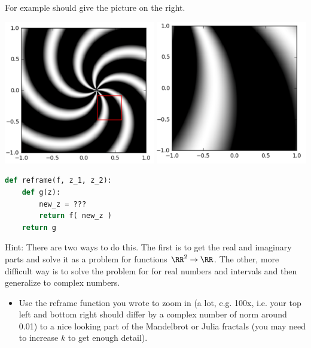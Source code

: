 \documentclass[letterpaper,11pt]{amsart}
\theoremstyle{plain}
\theoremstyle{definition}
\begin{document}
For example  should give the picture on the right. 
\begin{center}
\noindent\includegraphics[width=2.6in]{im5_prezoom.png}
\noindent\includegraphics[width=2.6in]{im5_zoomed.png}
\end{center}

\begin{lstlisting}[language=python]
def reframe(f, z_1, z_2):
    def g(z):
        new_z = ???
        return f( new_z )
    return g
\end{lstlisting}

Hint: There are two ways to do this. The first is to get the real and imaginary parts and solve it as a problem for functions $\RR^{2} \to \RR$. The other, more difficult way is to solve the problem for for real numbers and intervals and then generalize to complex numbers.

\begin{itemize}
  \item Use the reframe function you wrote to zoom in (a lot, e.g. 100x, i.e. your top left and bottom right should differ by a complex number of norm around 0.01) to a nice looking part of the Mandelbrot or Julia fractals (you may need to increase $k$ to get enough detail). 
\end{itemize}
\end{document}
